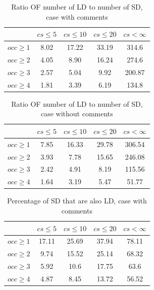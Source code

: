 \documentclass[a4paper,twoside]{article}
\begin{document}
\begin{table}[!h]
\renewcommand{\arraystretch}{1.25}
\caption{Ratio OF number of LD to number of SD, case with comments}
\label{tab:ratio:comm}
\centering

\begin{tabular}{|c|c|c|c|c|}
\hline
	      &	$cs\leq 5$	&	$cs\leq 10$	&	$cs\leq 20$	&	$cs<\infty$	\\
\hline
$occ\geq 1$	&	8.02	&	17.22	&	33.19	&	314.6	\\
$occ\geq 2$	&	4.05	&	8.90	&	16.24	&	274.6	\\
$occ\geq 3$	&	2.57	&	5.04	&	9.92	&	200.87	\\
$occ\geq 4$	&	1.81	&	3.39	&	6.19	&	134.8	\\
\hline
\end{tabular}
\end{table}


\begin{table}[!h]
\renewcommand{\arraystretch}{1.25}
\caption{Ratio OF number of LD to number of SD, case without comments}
\label{tab:ratio:nocomm}
\centering

\begin{tabular}{|c|c|c|c|c|}
\hline
	      &	$cs\leq 5$	&	$cs\leq 10$	&	$cs\leq 20$	&	$cs< \infty$	\\
\hline
$occ\geq 1$	&	7.85	&	16.33	&	29.78	&	306.54	\\
$occ\geq 2$	&	3.93	&	7.78	&	15.65	&	246.08	\\
$occ\geq 3$	&	2.42	&	4.91	&	8.19	&	115.56	\\
$occ\geq 4$	&	1.64	&	3.19	&	5.47	&	51.77	\\

\hline
\end{tabular}
\end{table}


\begin{table}[!h]
\renewcommand{\arraystretch}{1.25}
\caption{Percentage of SD that are also LD, case with comments}
\label{tab:percSD:comm}
\centering

\begin{tabular}{|c|c|c|c|c|}
\hline
	      &	$cs\leq 5$	&	$cs\leq 10$	&	$cs\leq 20$	&	$cs< \infty$	\\
\hline
$occ\geq 1$	&	17.11	&	25.69	&	37.94	&	78.11	\\
$occ\geq 2$	&	9.74	&	15.52	&	25.14	&	68.32	\\
$occ\geq 3$	&	5.92	&	10.6	&	17.75	&	63.6	\\
$occ\geq 4$	&	4.87	&	8.45	&	13.72	&	56.52	\\
\hline
\end{tabular}
\end{table}
\end{document}
